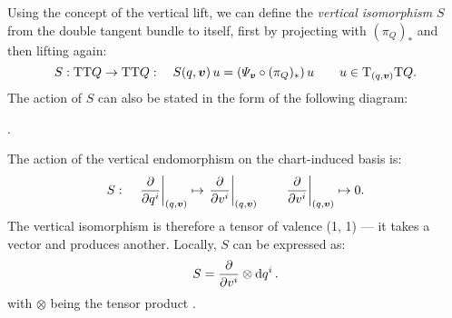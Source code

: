 Using the concept of the vertical lift, we can define the \emph{vertical isomorphism} \(S\) from the double tangent bundle to itself, first by projecting with \((\pi_Q)_*\) and then lifting again:
\begin{equation}
     S: \tbundle{\tbundle{Q}} \to \tbundle{\tbundle{Q}}: \quad S(q, \vec{v})\,u = \qty(\Psi_{\vec{v}} \circ (\pi_Q)_*)\,u \qquad u \in \tspace{(q, \vec{v})}{\tbundle{Q}}.
\end{equation}
The action of \(S\) can also be stated in the form of the following diagram:
\begin{center}
   .
\end{center}
The action of the vertical endomorphism on the chart-induced basis is:
\begin{equation}
     S: \quad \left. \pdv{}{q^i}\right|_{(q, \vec{v})} \mapsto \left.\pdv{}{v^i}\right|_{(q, \vec{v})} \qquad  \left. \pdv{}{v^i}\right|_{(q, \vec{v})} \mapsto 0.
\end{equation}
The vertical isomorphism is therefore a tensor of valence (1, 1) --- it takes a vector and produces another. Locally, \(S\) can be expressed as:
\begin{equation}
     S = \pdv{}{v^i}\otimes \dd{q^i}.
\end{equation}
with \(\otimes\) being the tensor product \cite{Carinena1990}.

